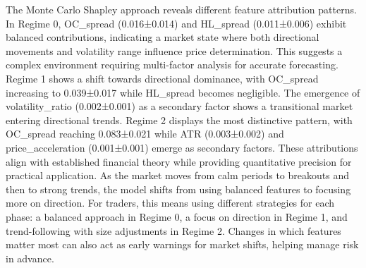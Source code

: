 \documentclass[conference,10pt]{IEEEtran}
\begin{document}
The Monte Carlo Shapley approach reveals different feature attribution patterns. In Regime 0, OC\_spread (0.016±0.014) and HL\_spread (0.011±0.006) exhibit balanced contributions, indicating a market state where both directional movements and volatility range influence price determination. This suggests a complex environment requiring multi-factor analysis for accurate forecasting. Regime 1 shows a shift towards directional dominance, with OC\_spread increasing to 0.039±0.017 while HL\_spread becomes negligible. The emergence of volatility\_ratio (0.002±0.001) as a secondary factor shows a transitional market entering directional trends. Regime 2 displays the most distinctive pattern, with OC\_spread reaching 0.083±0.021 while ATR (0.003±0.002) and price\_acceleration (0.001±0.001) emerge as secondary factors. These attributions align with established financial theory while providing quantitative precision for practical application. As the market moves from calm periods to breakouts and then to strong trends, the model shifts from using balanced features to focusing more on direction. For traders, this means using different strategies for each phase: a balanced approach in Regime 0, a focus on direction in Regime 1, and trend-following with size adjustments in Regime 2. Changes in which features matter most can also act as early warnings for market shifts, helping manage risk in advance. 
\end{document}
